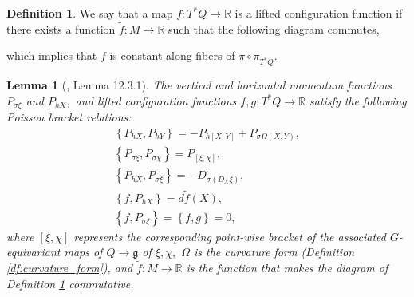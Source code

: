 \documentclass[12pt, letterpaper, reqno]{amsart}
\theoremstyle{definition}
\newtheorem{df}{Definition}
\theoremstyle{plain}
\newtheorem{lm}{Lemma}
\theoremstyle{remark}
\begin{document}
\begin{df}\label{df:lifted_configuration_function}
	We say that a map $ f: T^*Q \rightarrow \mathbb{R} $ is a lifted configuration function if there exists a function $ \tilde f: M \rightarrow \mathbb{R} $ such that the following diagram commutes,
	\begin{center}
	\end{center}
	which implies that $ f $ is constant along fibers of $ \pi\circ \pi_{T^*Q}. $ 
\end{df}
\begin{lm}[\cite{montgomery2002tour}, Lemma 12.3.1]
	The vertical and horizontal momentum functions $ P_{\sigma\xi} $ and $ P_{hX}, $ and lifted configuration functions $ f,g: T^*Q \rightarrow \mathbb{R} $ satisfy the following Poisson bracket relations: 	
	\begin{align}
		\left\{ P_{hX}, P_{hY} \right\} = -P_{h[X,Y]}+P_{\sigma\Omega(X,Y)},\label{eq:lemma_1}\\ 
	\left\{ P_{\sigma \xi}, P_{\sigma\chi} \right\} = P_{[\xi, \chi]},\\
	\left\{ P_{hX}, P_{\sigma\xi} \right\} = -D_{\sigma(D_X\xi)},\\
	\left\{ f, P_{hX} \right\} = d\tilde f(X),\\ \label{eq:lemma_4}
	\left\{ f, P_{\sigma\xi} \right\} = \left\{ f,g \right\} =0,
	\end{align}
	where $\left[ \xi, \chi \right]$ 	represents the corresponding point-wise bracket of the associated $ G $-equivariant maps of $ Q \rightarrow \mathfrak{g} $ of $ \xi,\chi, $ $\Omega$ is the curvature form (Definition \ref{df:curvature_form}), and $ \tilde f : M \rightarrow \mathbb{R} $ is the function that makes the diagram of Definition \ref{df:lifted_configuration_function} commutative.
\end{lm}
\end{document}
